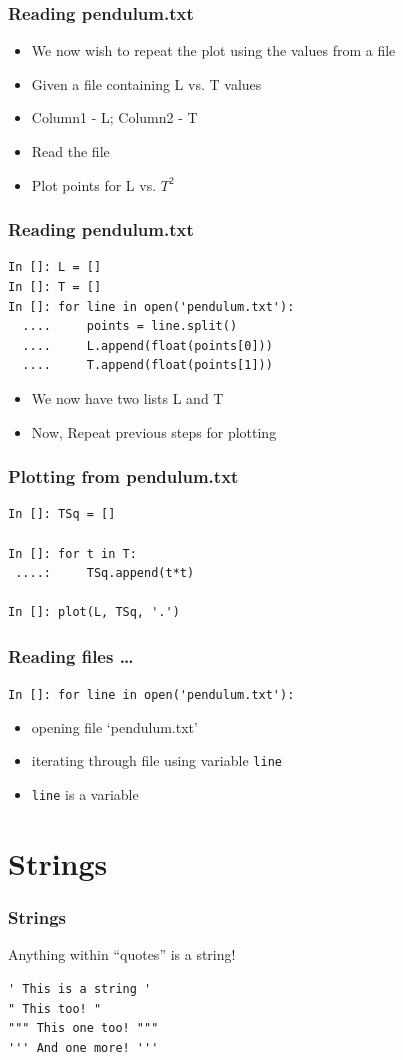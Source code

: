 \documentclass[14pt,compress]{beamer}
\newcommand{\typ}[1]{\lstinline{#1}}
\newcommand{\kwrd}[1]{ \texttt{\textbf{\color{blue}{#1}}}  }
\begin{document}
\begin{frame}[fragile]
\frametitle{Reading pendulum.txt}
\begin{itemize}
  \item We now wish to repeat the plot using the values from a file
  \item Given a file containing L vs. T values 
  \item Column1 - L; Column2 - T  
  \item Read the file
  \item Plot points for L vs. $T^2$ 
\end{itemize}
\end{frame}

\begin{frame}[fragile]
\frametitle{Reading pendulum.txt}
\begin{lstlisting}
In []: L = []
In []: T = []
In []: for line in open('pendulum.txt'):
  ....     points = line.split()
  ....     L.append(float(points[0]))
  ....     T.append(float(points[1]))
\end{lstlisting}
\begin{itemize}
\item We now have two lists L and T
\item Now, Repeat previous steps for plotting
\end{itemize}
\end{frame}

\begin{frame}[fragile]
\frametitle{Plotting from pendulum.txt}
\begin{lstlisting}
In []: TSq = []

In []: for t in T:
 ....:     TSq.append(t*t)

In []: plot(L, TSq, '.')
\end{lstlisting}
\end{frame}

\begin{frame}[fragile]
  \frametitle{Reading files \ldots}
\typ{In []: for line in open('pendulum.txt'):}
\begin{itemize}
\item opening file `pendulum.txt'
\item iterating through file using variable \typ{line}
\item \typ{line} is a \kwrd{string} variable
\end{itemize}
\end{frame}

\section{Strings}
\begin{frame}[fragile]
\frametitle{Strings}
Anything within ``quotes'' is a string!
\begin{lstlisting}
' This is a string '  
" This too! "
""" This one too! """
''' And one more! '''
\end{lstlisting}
\end{frame}
\end{document}
